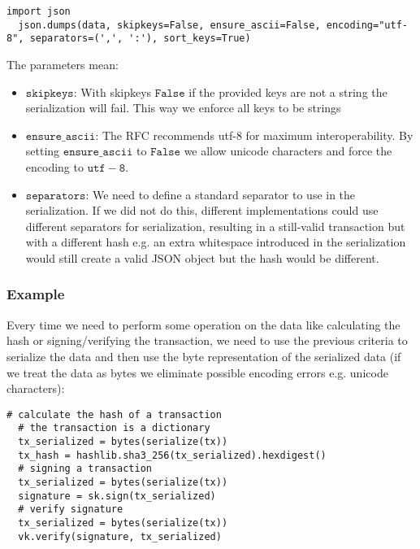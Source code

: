 \begin{minipage}{\linewidth}
  \begin{lstlisting}[style=python]
  import json 
  json.dumps(data, skipkeys=False, ensure_ascii=False, encoding="utf-8", separators=(',', ':'), sort_keys=True)\end{lstlisting}
\end{minipage}

\noindent The parameters mean: 
\begin{itemize}
 \item $\mathtt{skipkeys}$: With skipkeys $\mathtt{False}$ if the provided keys are not a string the serialization will fail. This way we enforce all keys to be strings
 \item $\mathtt{ensure\_ascii}$: The RFC recommends utf-8 for maximum interoperability. By setting $\mathtt{ensure\_ascii}$ to $\mathtt{False}$ we allow unicode characters and force the encoding to $\mathtt{utf-8}$. 
 \item $\mathtt{separators}$: We need to define a standard separator to use in the serialization. If we did not do this, different implementations could use different separators for serialization, resulting in a still-valid transaction but with a different hash e.g. an extra whitespace introduced in the serialization would still create a valid JSON object but the hash would be different.
\end{itemize}

\subsubsection{Example}
Every time we need to perform some operation on the data like calculating the hash or signing/verifying the transaction, we need to use the previous criteria to serialize the data and then use the byte representation of the serialized data (if we treat the data as bytes we eliminate possible encoding errors e.g. unicode characters):

\begin{minipage}{\linewidth}
  \begin{lstlisting}[style=python]
  # calculate the hash of a transaction 
  # the transaction is a dictionary 
  tx_serialized = bytes(serialize(tx)) 
  tx_hash = hashlib.sha3_256(tx_serialized).hexdigest() 
  # signing a transaction 
  tx_serialized = bytes(serialize(tx)) 
  signature = sk.sign(tx_serialized) 
  # verify signature 
  tx_serialized = bytes(serialize(tx)) 
  vk.verify(signature, tx_serialized)\end{lstlisting}
\end{minipage}
